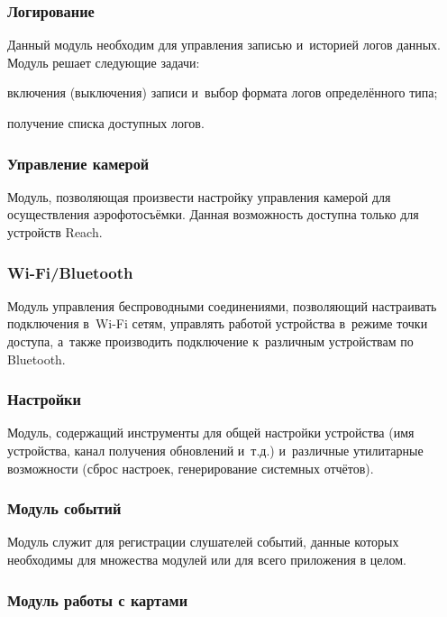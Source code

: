 \subsubsection{Логирование}

Данный модуль необходим для управления записью и~историей логов данных. Модуль решает следующие задачи:
\begin{dashitemize}
  \item включения (выключения) записи и~выбор формата логов определённого типа;
  \item получение списка доступных логов.
\end{dashitemize}

\subsubsection{Управление камерой}

Модуль, позволяющая произвести настройку управления камерой для осуществления аэрофотосъёмки. Данная возможность доступна только для устройств Reach.

\subsubsection{Wi-Fi/Bluetooth}

Модуль управления беспроводными соединениями, позволяющий настраивать подключения в~Wi-Fi сетям, управлять работой устройства в~режиме точки доступа, а~также производить подключение к~различным устройствам по Bluetooth.

\subsubsection{Настройки}

Модуль, содержащий инструменты для общей настройки устройства (имя устройства, канал получения обновлений и~т.д.) и~различные утилитарные возможности (сброс настроек, генерирование системных отчётов).

\subsubsection{Модуль событий}

Модуль служит для регистрации слушателей событий, данные которых необходимы для множества модулей или для всего приложения в целом.

\subsubsection{Модуль работы с картами}

